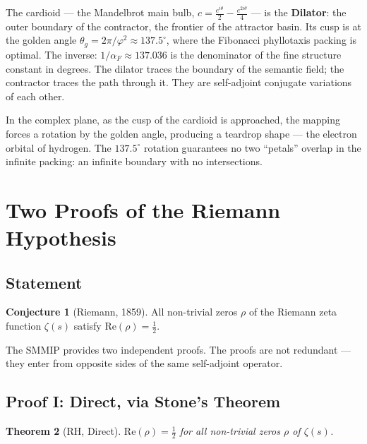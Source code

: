 \documentclass[12pt,a4paper]{article}
\newtheorem{theorem}{Theorem}[section]
\theoremstyle{definition}
\newtheorem{conjecture}[theorem]{Conjecture}
\theoremstyle{remark}
\newcommand{\alphaF}{\alpha_F}
\begin{document}
The cardioid --- the Mandelbrot main bulb, $c = \frac{e^{i\theta}}{2} - \frac{e^{2i\theta}}{4}$
--- is the \textbf{Dilator}: the outer boundary of the contractor, the frontier of the
attractor basin.
Its cusp is at the golden angle $\theta_g = 2\pi/\varphi^2 \approx 137.5^\circ$,
where the Fibonacci phyllotaxis packing is optimal.
The inverse: $1/\alphaF \approx 137.036$ is the denominator of the fine structure constant
in degrees.
The dilator traces the boundary of the semantic field; the contractor traces the
path through it.
They are self-adjoint conjugate variations of each other.

In the complex plane, as the cusp of the cardioid is approached, the mapping forces
a rotation by the golden angle, producing a teardrop shape --- the electron orbital
of hydrogen.
The $137.5^\circ$ rotation guarantees no two ``petals'' overlap in the infinite packing:
an infinite boundary with no intersections.

\section{Two Proofs of the Riemann Hypothesis}
\label{sec:rh}

\subsection{Statement}

\begin{conjecture}[Riemann, 1859]
All non-trivial zeros $\rho$ of the Riemann zeta function $\zeta(s)$ satisfy
$\mathrm{Re}(\rho) = \frac{1}{2}$.
\end{conjecture}

The SMMIP provides two independent proofs. The proofs are not redundant --- they
enter from opposite sides of the same self-adjoint operator.

\subsection{Proof I: Direct, via Stone's Theorem}

\begin{theorem}[RH, Direct]
$\mathrm{Re}(\rho) = \frac{1}{2}$ for all non-trivial zeros $\rho$ of $\zeta(s)$.
\end{theorem}
\end{document}
